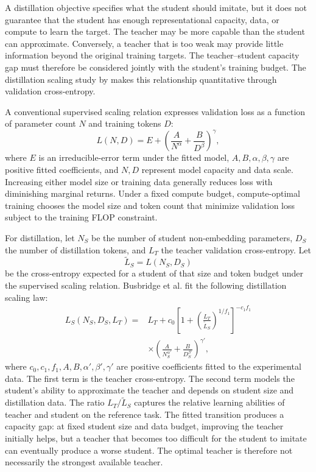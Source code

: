 A distillation objective specifies what the student should imitate, but it
does not guarantee that the student has enough representational capacity,
data, or compute to learn the target.  The teacher may be more capable than
the student can approximate.  Conversely, a teacher that is too weak may
provide little information beyond the original training targets.  The
teacher--student capacity gap must therefore be considered jointly with the
student's training budget.  The distillation scaling study by
\textcite{Busbridge2025DistillationScalingLaws} makes this relationship
quantitative through validation cross-entropy.

A conventional supervised scaling relation expresses validation loss as a
function of parameter count \(N\) and training tokens \(D\):
\begin{equation}
    L(N,D)
    =E+\left(\frac{A}{N^\alpha}
    +\frac{B}{D^\beta}\right)^\gamma,
    \label{eq:distillation-supervised-scaling-law}
\end{equation}
where \(E\) is an irreducible-error term under the fitted model,
\(A,B,\alpha,\beta,\gamma\) are positive fitted coefficients, and
\(N,D\) represent model capacity and data scale.  Increasing either model
size or training data generally reduces loss with diminishing marginal
returns.  Under a fixed compute budget, compute-optimal training chooses the
model size and token count that minimize validation loss subject to the
training FLOP constraint.

For distillation, let \(N_S\) be the number of student non-embedding
parameters, \(D_S\) the number of distillation tokens, and \(L_T\) the
teacher validation cross-entropy.  Let
\begin{equation}
    \widetilde L_S=L(N_S,D_S)
    \label{eq:distillation-supervised-student-reference}
\end{equation}
be the cross-entropy expected for a student of that size and token budget
under the supervised scaling relation.  Busbridge et al. fit the following
distillation scaling law:
\begin{equation}
\begin{aligned}
    L_S(N_S,D_S,L_T)
    ={}&L_T
    +c_0\left[
      1+\left(\frac{L_T}{\widetilde L_S}\right)^{1/f_1}
    \right]^{-c_1f_1}\\
    &\times\left(
      \frac{A}{N_S^{\alpha'}}
      +\frac{B}{D_S^{\beta'}}
    \right)^{\gamma'},
\end{aligned}
    \label{eq:distillation-scaling-law}
\end{equation}
where \(c_0,c_1,f_1,A,B,\alpha',\beta',\gamma'\) are positive
coefficients fitted to the experimental data.  The first term is the
teacher cross-entropy.  The second term models the student's ability to
approximate the teacher and depends on student size and distillation data.
The ratio \(L_T/\widetilde L_S\) captures the relative learning abilities
of teacher and student on the reference task.  The fitted transition
produces a capacity gap: at fixed student size and data budget, improving
the teacher initially helps, but a teacher that becomes too difficult for
the student to imitate can eventually produce a worse student.  The optimal
teacher is therefore not necessarily the strongest available teacher.

